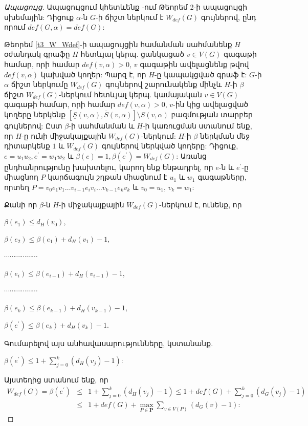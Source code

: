 \begin{proof}[Ապացույց] Ապացույցում կհետևենք \cite{AsratianKamalian1994}-ում Թեորեմ 2-ի ապացույցի սխեմային:
Դիցուք $\alpha$-ն $G$-ի ճիշտ ներկում է $W_{def}(G)$ գույներով, ընդ որում $def(G,\alpha)=def(G)$:

Թեորեմ \ref{t3_W_Wdef}-ի ապացույցին համանման սահմանենք $H$ օժանդակ գրաֆը $H$ հետևյալ կերպ. ցանկացած $v\in V(G)$ գագաթի համար, որի համար $def(v,\alpha)>0$, $v$ գագաթին ավելացնենք թվով $def(v,\alpha)$ կախված կողեր: Պարզ է, որ $H$-ը կապակցված գրաֆ է: 
$G$-ի $\alpha$ ճիշտ ներկումը $W_{def}(G)$ գույներով շարունակենք մինչև $H$-ի $\beta$ ճիշտ $W_{def}(G)$-ներկում հետևյալ կերպ.
կամայական $v\in V(G)$ գագաթի համար, որի համար $def(v,\alpha)>0$, $v$-ին կից ավելացված կողերը ներկենք $\left[\underline
S\left(v,\alpha \right),\overline S\left(v,\alpha
\right)\right]\setminus S(v,\alpha)$ բազմության տարբեր գույներով: Ըստ $\beta$-ի սահմանման և $H$-ի կառուցման ստանում ենք, որ $H$-ը ունի միջակայքային
$W_{def}(G)$-ներկում: $H$-ի $\beta$ ներկման մեջ դիտարկենք $1$ և $W_{def}(G)$ գույներով ներկված կողերը: Դիցուք, $e=u_{1}u_{2},
e^{\prime}=w_{1}w_{2}$ և $\beta(e)=1,
\beta(e^{\prime})=W_{def}(G)$: Առանց ընդհանրությունը խախտելու, կարող ենք ենթադրել, որ $e$-ն և $e^{\prime}$-ը միացնող $P$ կարճագույն շղթան միացնում է 
$u_{1}$ և $w_{1}$ գագաթները, որտեղ $P=v_{0}e_{1}v_{1}\ldots
v_{i-1}e_{i}v_{i}\ldots v_{k-1}e_{k}v_{k}$ և $v_{0}=u_{1}$,
$v_{k}=w_{1}$:

Քանի որ $\beta$-ն $H$-ի միջակայքային $W_{def}(G)$-ներկում է, ունենք, որ

\begin{center}
$\beta(e_{1})\leq d_{H}(v_{0})$,

$\beta(e_{2})\leq \beta(e_{1})+d_{H}(v_{1})-1$,

$\cdots \cdots \cdots \cdots \cdots \cdots$

$\beta(e_{i})\leq \beta(e_{i-1})+d_{H}(v_{i-1})-1$,

$\cdots \cdots \cdots \cdots \cdots \cdots$

$\beta(e_{k})\leq \beta(e_{k-1})+d_{H}(v_{k-1})-1$,

$\beta(e^{\prime})\leq \beta(e_{k})+d_{H}(v_{k})-1$.

\end{center}

Գումարելով այս անհավասարությունները, կստանանք.

\begin{center}
$\beta(e^{\prime})\leq 
1+{\sum\limits_{j=0}^{k}\left(d_{H}(v_{j})-1\right)}$:
\end{center}

Այստեղից ստանում ենք, որ
\begin{eqnarray*}
W_{def}(G)=\beta(e^{\prime}) &\leq&
1+{\sum\limits_{j=0}^{k}\left(d_{H}(v_{j})-1\right)}\leq
1+def(G)+{\sum\limits_{j=0}^{k}\left(d_{G}(v_{j})-1\right)}\\
&\leq& 1+def(G)+{\max\limits_{P\in \mathbf{P}}}{\sum\limits_{v\in
V(P)}}\left(d_{G}(v)-1\right):
\end{eqnarray*}
\end{proof}

